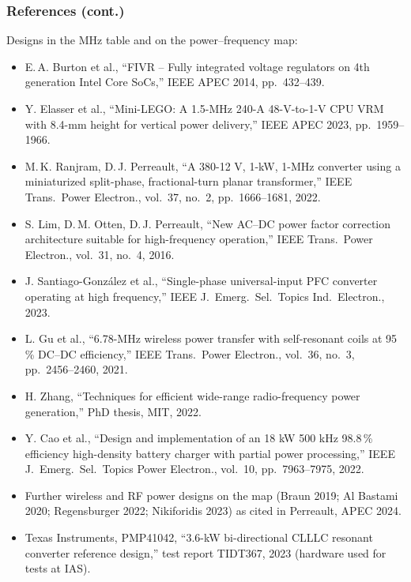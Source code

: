 \begin{frame}
	\frametitle{References (cont.)}
	\scriptsize
	Designs in the MHz table and on the power--frequency map:
	\begin{itemize}
		\item E.\,A. Burton et al., ``FIVR -- Fully integrated voltage regulators on 4th generation Intel Core SoCs,'' IEEE APEC 2014, pp.\ 432--439.
		\item Y. Elasser et al., ``Mini-LEGO: A 1.5-MHz 240-A 48-V-to-1-V CPU VRM with 8.4-mm height for vertical power delivery,'' IEEE APEC 2023, pp.\ 1959--1966.
		\item M.\,K. Ranjram, D.\,J. Perreault, ``A 380-12 V, 1-kW, 1-MHz converter using a miniaturized split-phase, fractional-turn planar transformer,'' IEEE Trans.\ Power Electron., vol.\ 37, no.\ 2, pp.\ 1666--1681, 2022.
		\item S. Lim, D.\,M. Otten, D.\,J. Perreault, ``New AC--DC power factor correction architecture suitable for high-frequency operation,'' IEEE Trans.\ Power Electron., vol.\ 31, no.\ 4, 2016.
		\item J. Santiago-Gonz\'alez et al., ``Single-phase universal-input PFC converter operating at high frequency,'' IEEE J.\ Emerg.\ Sel.\ Topics Ind.\ Electron., 2023.
		\item L. Gu et al., ``6.78-MHz wireless power transfer with self-resonant coils at 95\,\% DC--DC efficiency,'' IEEE Trans.\ Power Electron., vol.\ 36, no.\ 3, pp.\ 2456--2460, 2021.
		\item H. Zhang, ``Techniques for efficient wide-range radio-frequency power generation,'' PhD thesis, MIT, 2022.
		\item Y. Cao et al., ``Design and implementation of an 18 kW 500 kHz 98.8\,\% efficiency high-density battery charger with partial power processing,'' IEEE J.\ Emerg.\ Sel.\ Topics Power Electron., vol.\ 10, pp.\ 7963--7975, 2022.
		\item Further wireless and RF power designs on the map (Braun 2019; Al Bastami 2020; Regensburger 2022; Nikiforidis 2023) as cited in Perreault, APEC 2024.
		\item Texas Instruments, PMP41042, ``3.6-kW bi-directional CLLLC resonant converter reference design,'' test report TIDT367, 2023 (hardware used for tests at IAS).
	\end{itemize}
\end{frame}
